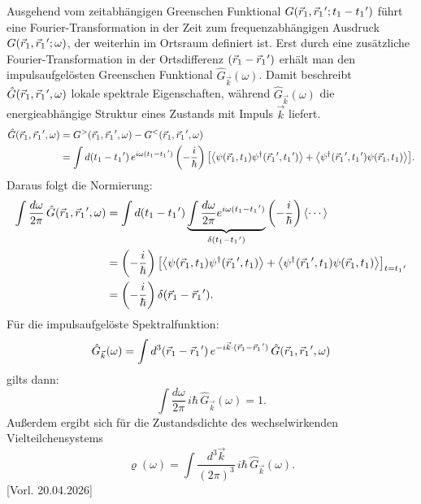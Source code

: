 Ausgehend vom zeitabhängigen Greenschen Funktional $G(\vec r_1,\vec r_1\mkern1mu';t_1-t_1\mkern1mu')$ führt eine Fourier-Transformation in der Zeit zum frequenzabhängigen Ausdruck $G(\vec r_1,\vec r_1\mkern1mu';\omega)$, der weiterhin im Ortsraum definiert ist. Erst durch eine zusätzliche Fourier-Transformation in der Ortsdifferenz $(\vec r_1-\vec r_1\mkern1mu')$ erhält man den impulsaufgelösten Greenschen Funktional $\hat G_{\vec k}(\omega)$. Damit beschreibt $\hat G(\vec r_1,\vec r_1\mkern1mu',\omega)$ lokale spektrale Eigenschaften, während $\hat G_{\vec k}(\omega)$ die energieabhängige Struktur eines Zustands mit Impuls $\vec k$ liefert.
\begin{align}
  \hat G(\vec r_1,\vec r_1\mkern1mu',\omega)
   & = G^{>}(\vec r_1,\vec r_1\mkern1mu',\omega)-G^{<}(\vec r_1,\vec r_1\mkern1mu',\omega) \\
   & = \int d(t_1-t_1\mkern1mu')\,e^{i\omega(t_1-t_1\mkern1mu')}
  \left(-\frac{i}{\hbar}\right)
  \bigl[\left\langle\psi(\vec r_1,t_1)\psi^{\dagger}(\vec r_1\mkern1mu',t_1\mkern1mu')\right\rangle+
    \left\langle\psi^{\dagger}(\vec r_1\mkern1mu',t_1\mkern1mu')\psi(\vec r_1,t_1)\right\rangle\bigr].
\end{align}
Daraus folgt die Normierung:
\begin{align}
  \int\frac{d\omega}{2\pi}\,\hat G(\vec r_1,\vec r_1\mkern1mu',\omega)
   & = \int d(t_1-t_1\mkern1mu')
  \underbrace{\int\frac{d\omega}{2\pi}e^{i\omega(t_1-t_1\mkern1mu')}}_{\delta(t_1-t_1\mkern1mu')}
  \left(-\frac{i}{\hbar}\right)\left\langle\cdots\right\rangle                                                \\
   & = \left(-\frac{i}{\hbar}\right)
  \bigl[\left\langle\psi(\vec r_1,t_1)\psi^{\dagger}(\vec r_1\mkern1mu',t_1)\right\rangle+
    \left\langle\psi^{\dagger}(\vec r_1\mkern1mu',t_1)\psi(\vec r_1,t_1)\right\rangle\bigr]_{t=t_1\mkern1mu'} \\
   & = \left(-\frac{i}{\hbar}\right)\delta(\vec r_1-\vec r_1\mkern1mu').
\end{align}
Für die impulsaufgelöste Spektralfunktion:
\begin{equation}
  \hat G_{\vec k}(\omega)=\int d^3(\vec r_1-\vec r_1\mkern1mu')\,e^{-i\vec k\cdot(\vec r_1-\vec r_1\mkern1mu')}\,\hat G(\vec r_1,\vec r_1\mkern1mu',\omega)
\end{equation}
gilts dann:
\begin{equation}
  \int\frac{d\omega}{2\pi}\,i\hbar\,\hat G_{\vec k}(\omega)=1.
\end{equation}
Außerdem ergibt sich für die Zustandsdichte des wechselwirkenden Vielteilchensystems
\begin{equation}
  \varrho(\omega)=\int\frac{d^3\vec k}{{(2\pi)}^3}\,i\hbar\,\hat G_{\vec k}(\omega).
\end{equation}
[Vorl. 20.04.2026]


